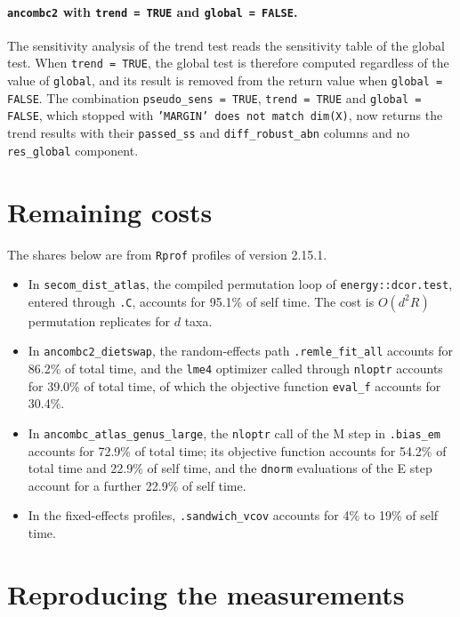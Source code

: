 \documentclass[11pt]{article}
\newcommand{\code}[1]{\texttt{#1}}
\begin{document}
\paragraph{\code{ancombc2} with \code{trend = TRUE} and
\code{global = FALSE}.} The sensitivity analysis of the trend test reads the
sensitivity table of the global test. When \code{trend = TRUE}, the global test
is therefore computed regardless of the value of \code{global}, and its result
is removed from the return value when \code{global = FALSE}. The combination
\code{pseudo\_sens = TRUE}, \code{trend = TRUE} and \code{global = FALSE},
which stopped with \code{'MARGIN' does not match dim(X)}, now returns the trend
results with their \code{passed\_ss} and \code{diff\_robust\_abn} columns and
no \code{res\_global} component.

\section{Remaining costs}

The shares below are from \code{Rprof} profiles of version 2.15.1.

\begin{itemize}
\item In \code{secom\_dist\_atlas}, the compiled permutation loop of
\code{energy::dcor.test}, entered through \code{.C}, accounts for 95.1\% of
self time. The cost is $O(d^2 R)$ permutation replicates for $d$ taxa.
\item In \code{ancombc2\_dietswap}, the random-effects path
\code{.remle\_fit\_all} accounts for 86.2\% of total time, and the \code{lme4}
optimizer called through \code{nloptr} accounts for 39.0\% of total time, of
which the objective function \code{eval\_f} accounts for 30.4\%.
\item In \code{ancombc\_atlas\_genus\_large}, the \code{nloptr} call of the M
step in \code{.bias\_em} accounts for 72.9\% of total time; its objective
function accounts for 54.2\% of total time and 22.9\% of self time, and the
\code{dnorm} evaluations of the E step account for a further 22.9\% of self
time.
\item In the fixed-effects profiles, \code{.sandwich\_vcov} accounts for 4\% to
19\% of self time.
\end{itemize}

\section{Reproducing the measurements}
\end{document}
